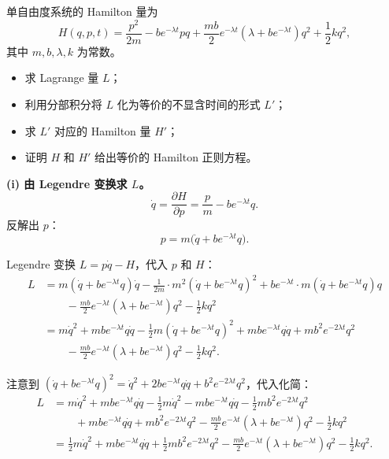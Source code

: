 \begin{question}
单自由度系统的 Hamilton 量为
\[
H(q,p,t) = \frac{p^2}{2m} - b e^{-\lambda t} p q + \frac{mb}{2} e^{-\lambda t}(\lambda + b e^{-\lambda t}) q^2 + \frac12 k q^2,
\]
其中 \(m,b,\lambda,k\) 为常数。

\begin{itemize}
  \item[(i)] 求 Lagrange 量 \(L\)；
  \item[(ii)] 利用分部积分将 \(L\) 化为等价的不显含时间的形式 \(L'\)；
  \item[(iii)] 求 \(L'\) 对应的 Hamilton 量 \(H'\)；
  \item[(iv)] 证明 \(H\) 和 \(H'\) 给出等价的 Hamilton 正则方程。
\end{itemize}

\begin{solution}
\textbf{(i) 由 Legendre 变换求 \(L\)。}
\[
\dot q = \frac{\partial H}{\partial p} = \frac{p}{m} - b e^{-\lambda t} q .
\]
反解出 \(p\)：
\[
p = m\bigl(\dot q + b e^{-\lambda t} q\bigr).
\]

Legendre 变换 \(L = p\dot q - H\)，代入 \(p\) 和 \(H\)：
\[
\begin{aligned}
L &= m(\dot q + b e^{-\lambda t} q)\dot q
- \frac{1}{2m}\cdot m^2(\dot q + b e^{-\lambda t} q)^2
+ b e^{-\lambda t}\cdot m(\dot q + b e^{-\lambda t} q) q \\
&\qquad - \frac{mb}{2} e^{-\lambda t}(\lambda + b e^{-\lambda t})q^2 - \frac12 k q^2 \\[2mm]
&= m\dot q^2 + m b e^{-\lambda t} q\dot q
- \frac12 m(\dot q + b e^{-\lambda t} q)^2
+ m b e^{-\lambda t} q\dot q + m b^2 e^{-2\lambda t} q^2 \\
&\qquad - \frac{mb}{2} e^{-\lambda t}(\lambda + b e^{-\lambda t}) q^2 - \frac12 k q^2 .
\end{aligned}
\]

注意到 \((\dot q + b e^{-\lambda t} q)^2 = \dot q^2 + 2b e^{-\lambda t} q\dot q + b^2 e^{-2\lambda t} q^2\)，代入化简：
\[
\begin{aligned}
L &= m\dot q^2 + m b e^{-\lambda t} q\dot q
- \frac12 m\dot q^2 - m b e^{-\lambda t} q\dot q - \frac12 m b^2 e^{-2\lambda t} q^2 \\
&\qquad + m b e^{-\lambda t} q\dot q + m b^2 e^{-2\lambda t} q^2
- \frac{mb}{2} e^{-\lambda t}(\lambda + b e^{-\lambda t}) q^2 - \frac12 k q^2 \\[2mm]
&= \frac12 m\dot q^2 + m b e^{-\lambda t} q\dot q
+ \frac12 m b^2 e^{-2\lambda t} q^2
- \frac{mb}{2} e^{-\lambda t}(\lambda + b e^{-\lambda t}) q^2 - \frac12 k q^2 .
\end{aligned}
\]


\end{solution}
\end{question}
